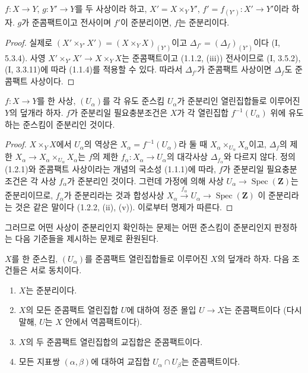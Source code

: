 \begin{proposition}[1.2.5]
\label{IV.1.2.5-fr}
$f:X\to Y$, $g:Y'\to Y$를 두 사상이라 하고,
$X'=X\times_Y Y'$, $f'=f_{(Y')}:X'\to Y'$이라 하자. $g$가
준콤팩트이고 전사이며 $f'$이 준분리이면, $f$는 준분리이다.
\end{proposition}

\begin{proof}
실제로 $(X'\times_{Y'}X')=(X\times_YX)_{(Y')}$이고
$\Delta_{f'}=(\Delta_f)_{(Y')}$이다 (I, 5.3.4). 사영
$X'\times_{Y'}X'\to X\times_YX$는 준콤팩트이고 (1.1.2, (iii))
전사이므로 (I, 3.5.2), (I, 3.3.11)에 따라 (1.1.4)를 적용할 수
있다. 따라서 $\Delta_{f'}$가 준콤팩트 사상이면 $\Delta_f$도
준콤팩트 사상이다.
\end{proof}

\begin{proposition}[1.2.6]
\label{IV.1.2.6-fr}
$f:X\to Y$를 한 사상, $(U_\alpha)$를 각 유도 준스킴
$U_\alpha$가 준분리인 열린집합들로 이루어진 $Y$의 덮개라 하자.
$f$가 준분리일 필요충분조건은 $X$가 각 열린집합
$f^{-1}(U_\alpha)$ 위에 유도하는 준스킴이 준분리인 것이다.
\end{proposition}

\begin{proof}
$X\times_YX$에서 $U_\alpha$의 역상은
$X_\alpha=f^{-1}(U_\alpha)$라 둘 때
$X_\alpha\times_{U_\alpha}X_\alpha$이고, $\Delta_f$의 제한
$X_\alpha\to X_\alpha\times_{U_\alpha}X_\alpha$는 $f$의 제한
$f_\alpha:X_\alpha\to U_\alpha$의 대각사상 $\Delta_{f_\alpha}$와
다르지 않다. 정의 (1.2.1)와 준콤팩트 사상이라는 개념의 국소성
(1.1.1)에 따라, $f$가 준분리일 필요충분조건은 각 사상
$f_\alpha$가 준분리인 것이다. 그런데 가정에 의해 사상
$U_\alpha\to\operatorname{Spec}(\mathbf Z)$는 준분리이므로,
$f_\alpha$가 준분리라는 것과 합성사상
$X_\alpha\xrightarrow{f_\alpha}U_\alpha\to\operatorname{Spec}(\mathbf Z)$
이 준분리라는 것은 같은 말이다 (1.2.2, (ii), (v)). 이로부터 명제가
따른다.
\end{proof}


그러므로 어떤 사상이 준분리인지 확인하는 문제는 어떤 준스킴이
준분리인지 판정하는 다음 기준들을 제시하는 문제로 환원된다.

\begin{proposition}[1.2.7]
\label{IV.1.2.7-fr}
$X$를 한 준스킴, $(U_\alpha)$를 준콤팩트 열린집합들로 이루어진
$X$의 덮개라 하자. 다음 조건들은 서로 동치이다.
\begin{enumerate}
  \item[a)] $X$는 준분리이다.
  \item[b)] $X$의 모든 준콤팩트 열린집합 $U$에 대하여 정준 몰입
  $U\to X$는 준콤팩트이다 (다시 말해, $U$는 $X$ 안에서
  역콤팩트이다).
  \item[b')] $X$의 두 준콤팩트 열린집합의 교집합은 준콤팩트이다.
  \item[c)] 모든 지표쌍 $(\alpha,\beta)$에 대하여 교집합
  $U_\alpha\cap U_\beta$는 준콤팩트이다.
\end{enumerate}
\end{proposition}

